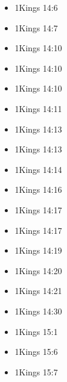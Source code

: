 \documentclass[14pt]{book}
\begin{document}
\begin{multicols}{2}
\begin{itemize}
											\item 1Kings 14:6
											
											\item 1Kings 14:7
											
											\item 1Kings 14:10
											
											\item 1Kings 14:10
											
											\item 1Kings 14:10
											
											\item 1Kings 14:11
											
											\item 1Kings 14:13
											
											\item 1Kings 14:13
											
											\item 1Kings 14:14
											
											\item 1Kings 14:16
											
											\item 1Kings 14:17
											
											\item 1Kings 14:17
											
											\item 1Kings 14:19
											
											\item 1Kings 14:20
											
											\item 1Kings 14:21
											
											\item 1Kings 14:30
											
											\item 1Kings 15:1
											
											\item 1Kings 15:6
											
											\item 1Kings 15:7
											

\end{itemize}
\end{multicols}
\end{document}
